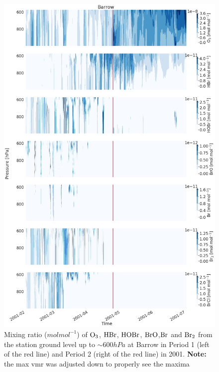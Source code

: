 \begin{figure}[h]
    \centering
    \includegraphics[width=0.8\linewidth]{Chapter6_Results/images/Vert_StationComp_2001/vert_all_species_BRW.png}
    \caption{Mixing ratio ($mol mol^{-1}$) of $\mathrm{O_3}$, $\mathrm{HBr}$, $\mathrm{HOBr}$, $\mathrm{BrO}$,$\mathrm{Br}$ and $\mathrm{Br_2}$ from the station ground level up to $\sim 600 hPa$ at Barrow in Period 1 (left of the red line) and Period 2 (right of the red line) in 2001. \textbf{Note:} the max  vmr was adjusted down to properly see the maxima}
    \label{fig:vert_BRW}
\end{figure}
